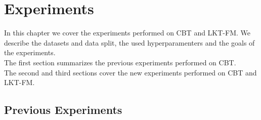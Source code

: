 \chapter{Experiments}
\label{ch:experiments}

In this chapter we cover the experiments performed on CBT and LKT-FM. We describe the datasets and data split, the used hyperparamenters and the goals of the experiments.\\
The first section summarizes the previous experiments performed on CBT.\\
The second and third sections cover the new experiments performed on CBT and LKT-FM.



\section{Previous Experiments}

